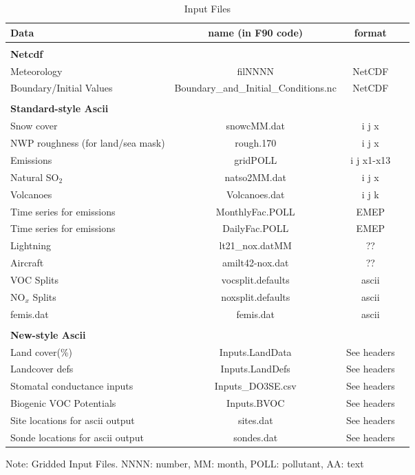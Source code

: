 \begin{table}[h]
\caption{Input Files}
\label{Tab:Inputs}
\begin{tabular}{p{6cm}ccc}\hline
Data & name (in F90 code) & format\\ \hline
   & & \\
\multicolumn{3}{l}{\bf Netcdf} \\
Meteorology&filNNNN&NetCDF\\
Boundary/Initial Values&Boundary\_and\_Initial\_Conditions.nc&NetCDF\\
   & & \\
\multicolumn{3}{l}{\bf Standard-style Ascii} \\
Snow cover&snowcMM.dat&i j x\\
NWP roughness (for land/sea mask) &  rough.170 & i j x\\
Emissions&gridPOLL&i j x1-x13\\
Natural SO$_{2}$&natso2MM.dat&i j x\\
Volcanoes&Volcanoes.dat&i j k   \\
Time series for emissions&MonthlyFac.POLL&EMEP\\
Time series for emissions&DailyFac.POLL&EMEP\\
Lightning&lt21\_nox.datMM&??& \\
Aircraft&amilt42-nox.dat&??&\\
VOC Splits&vocsplit.defaults&ascii \\
NO$_{x}$ Splits& noxsplit.defaults&ascii\\
femis.dat & femis.dat    & ascii  \\
   & & \\
\multicolumn{3}{l}{\bf New-style Ascii} \\
Land cover(\%) & Inputs.LandData& See headers \\ 
Landcover defs& Inputs.LandDefs& See headers \\ 
Stomatal conductance inputs& Inputs\_DO3SE.csv & See headers \\ 
Biogenic VOC Potentials&Inputs.BVOC& See headers \\
Site locations for ascii output& sites.dat& See headers \\
Sonde locations for ascii output& sondes.dat& See headers \\
\hline
\end{tabular}
Note: Gridded Input Files. NNNN: number, MM: month, POLL: pollutant, AA: text\\
\end{table}


